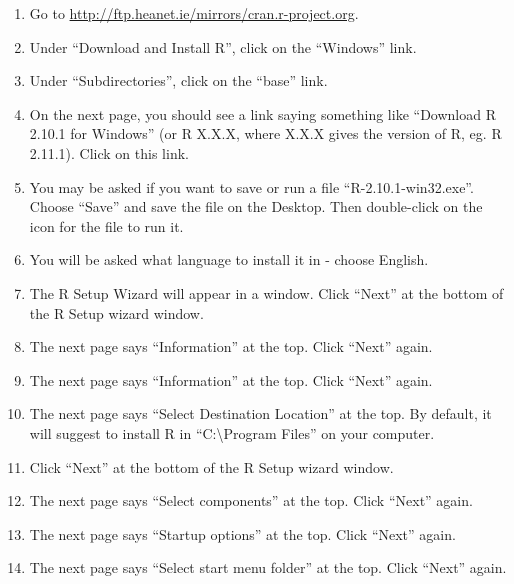\documentclass[a4paper,10pt,english]{sphinxmanual}
\begin{document}
\begin{enumerate}
\item {} 
Go to \href{http://ftp.heanet.ie/mirrors/cran.r-project.org}{http://ftp.heanet.ie/mirrors/cran.r-project.org}.

\item {} 
Under ``Download and Install R'', click on the ``Windows'' link.

\item {} 
Under ``Subdirectories'', click on the ``base'' link.

\item {} 
On the next page, you should see a link saying something like ``Download R 2.10.1 for Windows'' (or R X.X.X, where X.X.X gives the version of R, eg. R 2.11.1).
Click on this link.

\item {} 
You may be asked if you want to save or run a file ``R-2.10.1-win32.exe''. Choose ``Save'' and
save the file on the Desktop. Then double-click on the icon for the file to run it.

\item {} 
You will be asked what language to install it in - choose English.

\item {} 
The R Setup Wizard will appear in a window. Click ``Next'' at the bottom of the R Setup wizard
window.

\item {} 
The next page says ``Information'' at the top. Click ``Next'' again.

\item {} 
The next page says ``Information'' at the top. Click ``Next'' again.

\item {} 
The next page says ``Select Destination Location'' at the top.
By default, it will suggest to install R in ``C:\textbackslash{}Program Files'' on your computer.

\item {} 
Click ``Next'' at the bottom of the R Setup wizard window.

\item {} 
The next page says ``Select components'' at the top. Click ``Next'' again.

\item {} 
The next page says ``Startup options'' at the top. Click ``Next'' again.

\item {} 
The next page says ``Select start menu folder'' at the top. Click ``Next'' again.


\end{enumerate}
\end{document}

